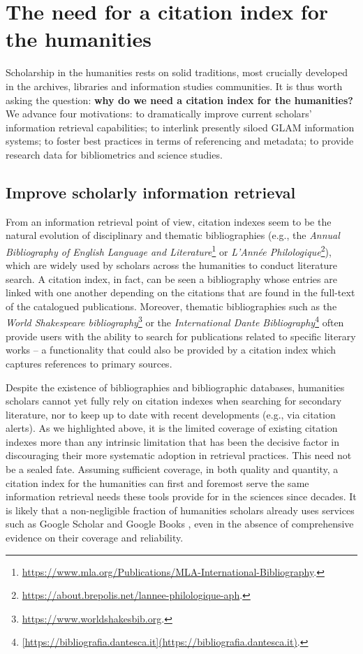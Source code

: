 \section{The need for a citation index for the humanities}\label{sec:citation-index-AH-needs}

Scholarship in the humanities rests on solid traditions, most crucially developed in the archives, libraries and information studies communities. It is thus worth asking the question: \textbf{why do we need a citation index for the humanities?} We advance four motivations: to dramatically improve current scholars’ information retrieval capabilities; to interlink presently siloed GLAM information systems; to foster best practices in terms of referencing and metadata; to provide research data for bibliometrics and science studies.

\subsection{Improve scholarly information retrieval}

From an information retrieval point of view, citation indexes seem to be the natural evolution of disciplinary and thematic bibliographies (e.g., the \textit{Annual Bibliography of English Language and Literature}\footnote{\url{https://www.mla.org/Publications/MLA-International-Bibliography}.} or \textit{L'Année Philologique}\footnote{\url{https://about.brepolis.net/lannee-philologique-aph}.}), which are widely used by scholars across the humanities to conduct literature search. A citation index, in fact, can be seen a bibliography whose entries are linked with one another depending on the citations that are found in the full-text of the catalogued publications. Moreover, thematic bibliographies such as the \textit{World Shakespeare bibliography}\footnote{\url{https://www.worldshakesbib.org}.} or the \textit{International Dante Bibliography}\footnote{\url{[https://bibliografia.dantesca.it](https://bibliografia.dantesca.it)}.} often provide users with the ability to search for publications related to specific literary works -- a functionality that could also be provided by a citation index which captures references to primary sources.

Despite the existence of bibliographies and bibliographic databases, humanities scholars cannot yet fully rely on citation indexes when searching for secondary literature, nor to keep up to date with recent developments (e.g., via citation alerts). As we highlighted above, it is the limited coverage of existing citation indexes more than any intrinsic limitation that has been the decisive factor in discouraging their more systematic adoption in retrieval practices. This need not be a sealed fate. Assuming sufficient coverage, in both quality and quantity, a citation index for the humanities can first and foremost serve the same information retrieval needs these tools provide for in the sciences since decades. It is likely that a non-negligible fraction of humanities scholars already uses services such as Google Scholar and Google Books \cite{chen_exploring_2019}, even in the absence of comprehensive evidence on their coverage and reliability.
 
